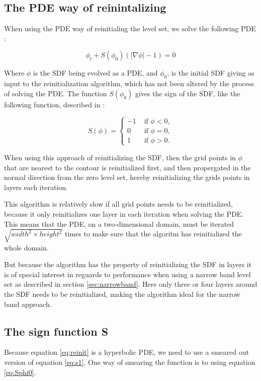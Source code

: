 \subsection{The PDE way of reinintalizing}
When using the PDE way of reinitialing the level set, we solve the
following PDE :

\begin{equation}
\label{eq:reinit}
\phi_t + S(\phi_0)(|\nabla \phi| - 1) = 0
\end{equation}

Where $\phi$ is the SDF being evolved as a PDE, and $\phi_0$, is the
initial SDF giving as input to the reinitialization algorithm, which
has not been altered by the process of solving the PDE. The function
$S(\phi_0)$ gives the sign of the SDF, like the following function,
described in :

\begin{equation}
\label{eq:s1}
S(\phi) =
\begin{cases}
-1 &\mbox{ if } \phi < 0, \\
 0 &\mbox{ if } \phi = 0, \\
 1 &\mbox{ if } \phi > 0.
\end{cases}
\end{equation}

When using this approach of reinitializing the SDF, then the grid
points in $\phi$ that are nearest to the contour is reinitialized
first, and then propergated in the normal direction from the zero
level set, hereby reinitializing the grids points in layers each
iteration.

This algorithm is relatively slow if all grid points needs to be
reinitialized, because it only reinitializes one layer in each
iteration when solving the PDE. This means that the PDE, on a
two-dimensional domain, must be iterated
$\sqrt{width^2 \times height^2}$ times to make sure that the algoritm
has reinitialized the whole domain.

But because the algorithm has the property of reinitializing the SDF
in layers it is of special interest in reguards to performance when
using a narrow band level set as described in section
\vref{sec:narrowband}. Here only three or four layers around the SDF needs
to be reinitialized, making the algorithm ideal for the narrow band
approach.

\subsection{The sign function S}
Because equation \ref{eq:reinit} is a hyperbolic PDE, we need to use a
smeared out version of equation \eqref{eq:s1}. One way of smearing the
function is to using equation \eqref{eq:Sphi0}.

